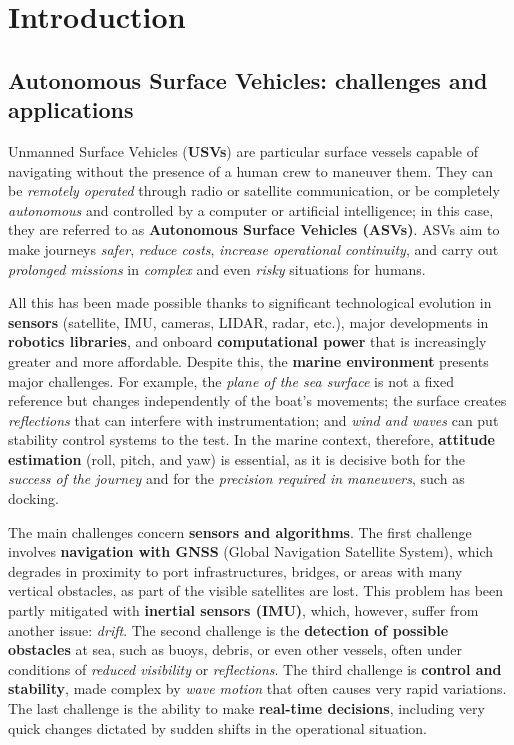 \chapter{Introduction}
\thispagestyle{empty}
\section{Autonomous Surface Vehicles: challenges and applications}
Unmanned Surface Vehicles (\textbf{USVs}) are particular surface vessels capable of navigating without the presence of a human crew to maneuver them. They can be \textit{remotely operated} through radio or satellite communication, or be completely \textit{autonomous} and controlled by a computer or artificial intelligence; in this case, they are referred to as \textbf{Autonomous Surface Vehicles (ASVs)}. ASVs aim to make journeys \textit{safer}, \textit{reduce costs}, \textit{increase operational continuity}, and carry out \textit{prolonged missions} in \textit{complex} and even \textit{risky} situations for humans.

All this has been made possible thanks to significant technological evolution in \textbf{sensors} (satellite, IMU, cameras, LIDAR, radar, etc.), major developments in \textbf{robotics libraries}, and onboard \textbf{computational power} that is increasingly greater and more affordable. Despite this, the \textbf{marine environment} presents major challenges. For example, the \textit{plane of the sea surface} is not a fixed reference but changes independently of the boat’s movements; the surface creates \textit{reflections} that can interfere with instrumentation; and \textit{wind and waves} can put stability control systems to the test. In the marine context, therefore, \textbf{attitude estimation} (roll, pitch, and yaw) is essential, as it is decisive both for the \textit{success of the journey} and for the \textit{precision required in maneuvers}, such as docking.

The main challenges concern \textbf{sensors and algorithms}. The first challenge involves \textbf{navigation with GNSS} (Global Navigation Satellite System), which degrades in proximity to port infrastructures, bridges, or areas with many vertical obstacles, as part of the visible satellites are lost. This problem has been partly mitigated with \textbf{inertial sensors (IMU)}, which, however, suffer from another issue: \textit{drift}. The second challenge is the \textbf{detection of possible obstacles} at sea, such as buoys, debris, or even other vessels, often under conditions of \textit{reduced visibility} or \textit{reflections}. The third challenge is \textbf{control and stability}, made complex by \textit{wave motion} that often causes very rapid variations. The last challenge is the ability to make \textbf{real-time decisions}, including very quick changes dictated by sudden shifts in the operational situation.

